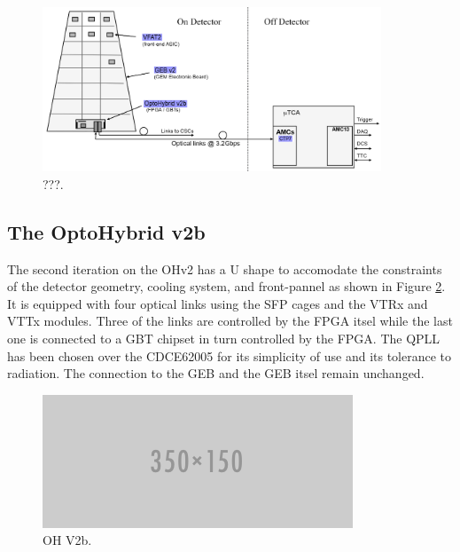     \begin{figure}[h!]
      \centering
      \includegraphics[width=0.9\textwidth]{img/II-2-daq/gem-system-v2b.pdf}
      \caption{???.}
      \label{fig:II-2-daq-gem-system-v2b}
    \end{figure}

    \subsection{The OptoHybrid v2b}

      The second iteration on the OHv2 has a U shape to accomodate the constraints of the detector geometry, cooling system, and front-pannel as shown in Figure \ref{fig:II-2-daq-ohv2b}. It is equipped with four optical links using the SFP cages and the VTRx and VTTx modules. Three of the links are controlled by the FPGA itsel while the last one is connected to a GBT chipset in turn controlled by the FPGA. The QPLL has been chosen over the CDCE62005 for its simplicity of use and its tolerance to radiation. The connection to the GEB and the GEB itsel remain unchanged.

      \begin{figure}[h!]
        \centering
        \includegraphics[width=\textwidth]{img/empty.png}
        \caption{OH V2b.}
        \label{fig:II-2-daq-ohv2b}
      \end{figure}

